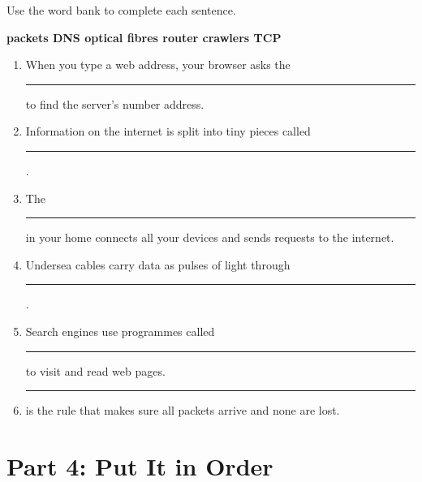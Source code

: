\begin{tcolorbox}[enhanced,colback=LeafGreen!8,colframe=LeafGreen,arc=6pt,boxrule=1pt,
  left=10pt,right=10pt,top=8pt,bottom=8pt]

Use the word bank to complete each sentence.

\begin{center}
\begin{tcolorbox}[colback=SunYellow!20,colframe=SunYellow!70!black,arc=4pt,boxrule=0.6pt,width=0.85\linewidth]
\centering\bfseries
packets \quad\quad DNS \quad\quad optical fibres \quad\quad router \quad\quad crawlers \quad\quad TCP
\end{tcolorbox}
\end{center}

\begin{enumerate}[label=\textbf{\arabic*.}]
  \item When you type a web address, your browser asks the \rule{3cm}{0.4pt} to find the server's number address.
  \item Information on the internet is split into tiny pieces called \rule{3cm}{0.4pt}.
  \item The \rule{3cm}{0.4pt} in your home connects all your devices and sends requests to the internet.
  \item Undersea cables carry data as pulses of light through \rule{3cm}{0.4pt}.
  \item Search engines use programmes called \rule{3cm}{0.4pt} to visit and read web pages.
  \item \rule{3cm}{0.4pt} is the rule that makes sure all packets arrive and none are lost.
\end{enumerate}
\end{tcolorbox}

\vspace{12pt}

\section*{Part 4: Put It in Order}


